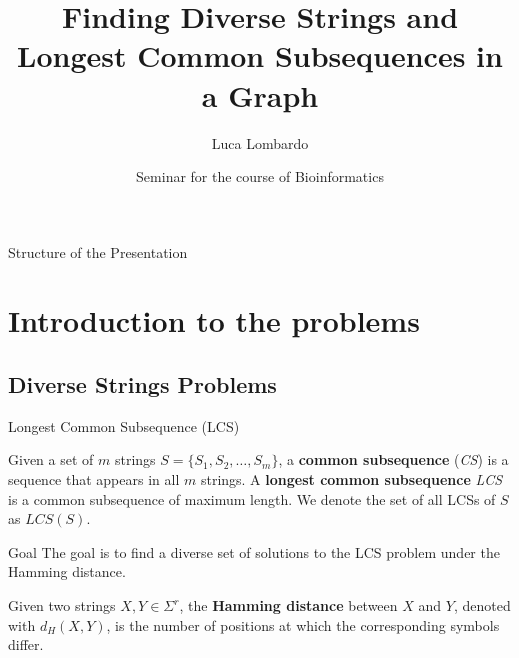 \documentclass{beamer}
\title{Finding Diverse Strings and Longest Common Subsequences in a Graph}
\author{Luca Lombardo}
\date{Seminar for the course of Bioinformatics}
\begin{document}
\begin{frame}
    \titlepage
\end{frame}


\begin{frame}{Structure of the Presentation}
    \tableofcontents
\end{frame}

\section{Introduction to the problems}
\subsection{Diverse Strings Problems}
\begin{frame}{Longest Common Subsequence (LCS)}
    \begin{definition}
        Given a set of $m$ strings $S = \{ S_1, S_2, \ldots, S_m \}$, a \textbf{common subsequence} (\emph{CS}) is a sequence that appears in all $m$ strings. A \textbf{longest common subsequence} \emph{LCS} is a common subsequence of maximum length. We denote the set of all LCSs of $S$ as $LCS(S)$.
    \end{definition}
    \begin{alertblock}{Goal}
        The goal is to find a diverse set of solutions to the LCS problem under the Hamming distance.
    \end{alertblock}
    \begin{definition}
        Given two strings $X, Y \in \Sigma^r$, the \textbf{Hamming distance} between $X$ and $Y$, denoted with $d_H(X,Y)$, is the number of positions at which the corresponding symbols differ.
    \end{definition}
\end{frame}


\end{document}
